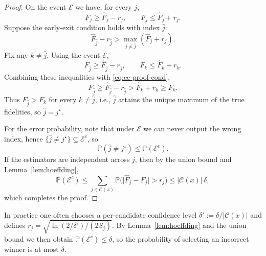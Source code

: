 \documentclass[11pt]{article}
\begin{document}
\begin{proof}
On the event \(\mathcal{E}\) we have, for every \(j\),
\begin{equation}
  F_j
  \ge \hat{F}_j - r_j,
  \qquad
  F_j
  \le \hat{F}_j + r_j.
\end{equation}
Suppose the early-exit condition holds with index \(\hat{j}\):
\begin{equation}
  \hat{F}_{\hat{j}} - r_{\hat{j}}
  >
  \max_{j\neq \hat{j}} (\hat{F}_j + r_j).
  \label{eq:ee-proof-cond}
\end{equation}
Fix any \(k\neq \hat{j}\).  Using the event \(\mathcal{E}\),
\begin{equation}
  F_{\hat{j}}
  \ge \hat{F}_{\hat{j}} - r_{\hat{j}},
  \qquad
  F_k
  \le \hat{F}_k + r_k.
\end{equation}
Combining these inequalities with \eqref{eq:ee-proof-cond},
\begin{equation}
  F_{\hat{j}}
  \ge \hat{F}_{\hat{j}} - r_{\hat{j}}
  >
  \hat{F}_k + r_k
  \ge F_k.
\end{equation}
Thus \(F_{\hat{j}} > F_k\) for every \(k\neq \hat{j}\), i.e.,
\(\hat{j}\) attains the unique maximum of the true fidelities, so
\(\hat{j}=j^\star\).

For the error probability, note that under \(\mathcal{E}\) we can never
output the wrong index, hence
\(\{\hat{j} \neq j^\star\} \subseteq \mathcal{E}^c\),
so
\begin{equation}
  \mathbb{P}(\hat{j} \neq j^\star)
  \le
  \mathbb{P}(\mathcal{E}^c).
\end{equation}
If the estimators are independent across \(j\), then by the union bound
and Lemma~\ref{lem:hoeffding},
\begin{equation}
  \mathbb{P}(\mathcal{E}^c)
  \le
  \sum_{j\in \mathcal{C}(x)}
  \mathbb{P}\bigl(\lvert\hat{F}_j - F_j\rvert > r_j\bigr)
  \le
  |\mathcal{C}(x)| \,\delta,
\end{equation}
which completes the proof.
\end{proof}

\begin{remark}
In practice one often chooses a per-candidate confidence level
\(\delta' := \delta / |\mathcal{C}(x)|\) and defines
\(r_j = \sqrt{\ln(2/\delta')/(2 S_j)}\).
By Lemma~\ref{lem:hoeffding} and the union bound we then obtain
\(\mathbb{P}(\mathcal{E}^c)\le \delta\), so the probability of selecting
an incorrect winner is at most \(\delta\).
\end{remark}
\end{document}
